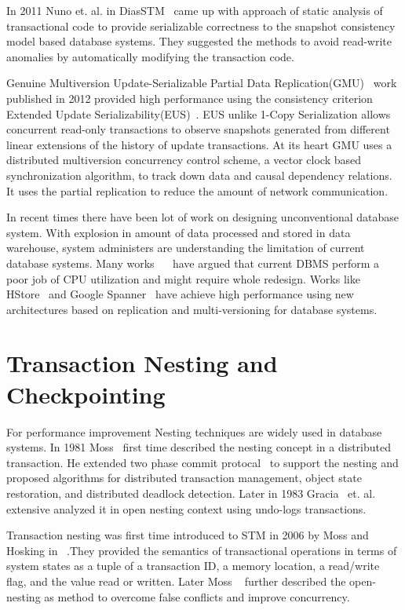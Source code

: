 \documentclass[12pt,english]{report}
\begin{document}
In 2011 Nuno et. al. in DiasSTM~\cite{dias2011efficient} came up with approach of static analysis of transactional code to provide serializable correctness to the snapshot consistency model based database systems. They suggested the methods to avoid read-write anomalies by automatically modifying the transaction code.

Genuine Multiversion Update-Serializable Partial Data Replication(GMU)~\cite{GMU:peluso2012scalability} work published in 2012 provided high performance using the consistency criterion Extended Update Serializability(EUS)~\cite{EUS:HansdahPatnaik}. EUS unlike 1-Copy Serialization allows concurrent read-only transactions to observe snapshots generated from different linear extensions of the history of update transactions. At its heart GMU uses a distributed multiversion concurrency control scheme, a vector clock based synchronization algorithm, to track down data and causal dependency relations. It uses the partial replication to reduce the amount of network communication.

In recent times there have been lot of work on designing unconventional database system. With explosion in amount of data processed and stored in data warehouse, system administers are understanding the limitation of current database systems. Many works ~\cite{Stonebraker:2007:EAE:1325851.1325981}~\cite{harizopoulos2008oltp} have argued that current DBMS perform a poor job of CPU utilization and might require whole redesign. Works like HStore~\cite{HSTORE:kallman2008h} and Google Spanner~\cite{corbett2012spanner} have achieve high performance using new architectures based on replication and multi-versioning for database systems.  

\section{Transaction Nesting and Checkpointing}

For performance improvement Nesting techniques are widely used in database systems. In 1981 Moss~\cite{moss1981nested} first time described the nesting concept in a distributed transaction. He extended two phase commit protocal~\cite{TwoPC:weikum1991principles} to support the nesting and proposed algorithms for distributed transaction management, object state restoration, and distributed deadlock detection. Later in 1983 Gracia~\cite{garcia1983using} et. al. extensive analyzed it in open nesting context using undo-logs transactions. 

Transaction nesting was first time introduced to STM in 2006 by  Moss and Hosking in ~\cite{moss2006nested}.They provided the semantics of transactional operations in terms of system states as a tuple of a transaction ID, a memory location, a read/write flag, and the value read or written. Later Moss ~\cite{moss2006open} further described the open-nesting as method to overcome false conflicts and improve concurrency. 
\end{document}
